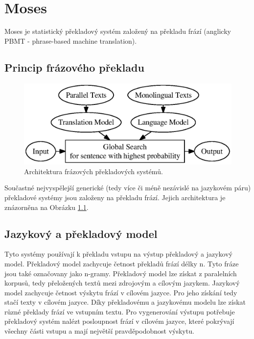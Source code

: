 \chapter{Moses}

Moses je statistický překladový systém založený na překladu frází (anglicky PBMT - phrase-based machine translation). 

\section{Princip frázového překladu}

\begin{figure}[ht]
\begin{center}
\includegraphics[scale=0.5,bb=36 36 416 186]{pictures/phrase-based.eps}
\end{center}
\caption{Architektura frázových překladových systémů.}
\label{phrase-based-models}
\end{figure}

Součastné nejvyspělejší generické (tedy více či méně nezávislé na jazykovém páru) překladové systémy jsou založeny na překladu frází. Jejich architektura je znázorněna na Obrázku \ref{phrase-based-models}.

\section{Jazykový a překladový model}
Tyto systémy používají k překladu vstupu na výstup překladový a jazykový model. Překladový model zachycuje četnost překladů frází délky n. Tyto fráze jsou také označovany jako n-gramy. Překladový model lze získat z paralelních korpusů, tedy přeložených textů mezi zdrojovým a cílovým jazykem. Jazykový model zachycuje četnost výskytu frází v cílovém jazyce. Pro jeho získání tedy stačí texty v cílovém jazyce. Díky překladovému a jazykovému modelu lze získat různé překlady frází ve vstupním textu. Pro vygenerování výstupu potřebuje překladový systém nalézt posloupnost frází v cílovém jazyce, které pokrývají všechny části vstupu a mají největší pravděpodobnost výskytu.

